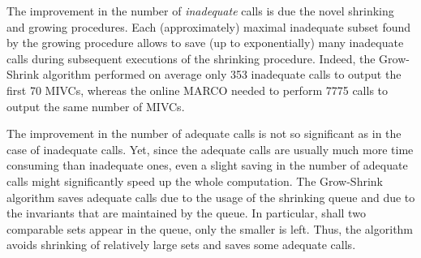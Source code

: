 The improvement in the number of \emph{inadequate} calls is due the novel shrinking and growing procedures.
Each (approximately) maximal inadequate subset found by the growing procedure allows to save (up to exponentially) many inadequate calls during subsequent executions of the shrinking procedure.
Indeed, the Grow-Shrink algorithm performed on average only 353 inadequate calls to output the first 70 MIVCs, whereas the online MARCO needed to perform 7775 calls to output the same number of MIVCs.

The improvement in the number of adequate calls is not so significant as in the case of inadequate calls. Yet, since the adequate calls are usually much more time consuming than inadequate ones, even a slight saving in the number of adequate calls might significantly speed up the whole computation. The Grow-Shrink algorithm saves adequate calls due to the usage of the shrinking queue and due to the invariants that are maintained by the queue. In particular, shall two comparable sets appear in the queue, only the smaller is left. Thus, the algorithm avoids shrinking of relatively large sets and saves some adequate calls.
